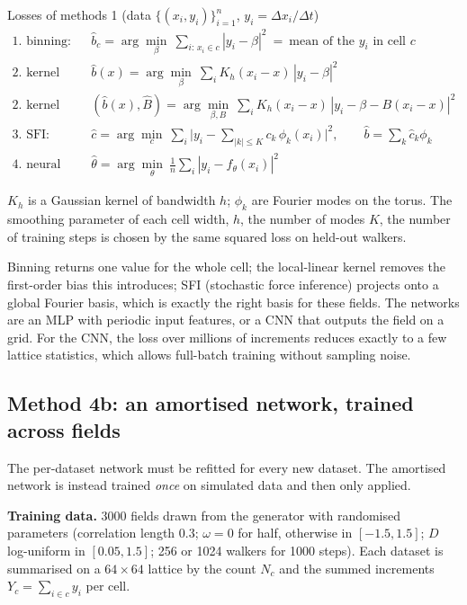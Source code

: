 \documentclass[11pt,a4paper]{article}
\newcommand{\dt}{\Delta t}
\newcommand{\dx}{\Delta x}
\begin{document}
\begin{lossbox}{Losses of methods 1 (data $\{(x_i,y_i)\}_{i=1}^n$, $y_i=\dx_i/\dt$)}
\vspace{-0.6em}
\begin{align*}
\text{1. binning:}\quad
  & \hat b_c = \arg\min_{\beta}\ \sum_{i:\,x_i\in c}|y_i-\beta|^2
    \ =\ \text{mean of the $y_i$ in cell $c$} \\
\text{2. kernel (NW):}\quad
  & \hat b(x) = \arg\min_{\beta}\ \sum_i K_h(x_i-x)\,|y_i-\beta|^2 \\
\text{2. kernel (local-linear):}\quad
  & (\hat b(x),\hat B) = \arg\min_{\beta,B}\ \sum_i K_h(x_i-x)\,|y_i-\beta-B(x_i-x)|^2 \\
\text{3. SFI:}\quad
  & \hat c = \arg\min_{c}\ \sum_i \Big|y_i-\sum_{|k|\le K} c_k\,\phi_k(x_i)\Big|^2,
    \qquad \hat b=\textstyle\sum_k \hat c_k\phi_k \\
\text{4. neural network:}\quad
  & \hat\theta = \arg\min_{\theta}\ \frac1n\sum_i |y_i-f_\theta(x_i)|^2
\end{align*}
\vspace{-1.1em}

$K_h$ is a Gaussian kernel of bandwidth $h$; $\phi_k$ are Fourier modes on the torus. The
smoothing parameter of each \textemdash{} cell width, $h$, the number of modes $K$, the number
of training steps \textemdash{} is chosen by the same squared loss on held-out walkers.
\end{lossbox}

Binning returns one value for the whole cell; the local-linear kernel removes the
first-order bias this introduces; SFI (stochastic force inference) projects onto a global
Fourier basis, which is exactly the right basis for these fields. The networks are an MLP
with periodic input features, or a CNN that outputs the field on a grid. For the CNN, the
loss over millions of increments reduces exactly to a few lattice statistics, which allows
full-batch training without sampling noise.

\subsection{Method 4b: an amortised network, trained across fields}

The per-dataset network must be refitted for every new dataset. The amortised network is
instead trained \emph{once} on simulated data and then only applied.

\textbf{Training data.} 3000 fields drawn from the generator with randomised parameters
(correlation length 0.3; $\omega=0$ for half, otherwise in $[-1.5,1.5]$; $D$
log-uniform in $[0.05,1.5]$; 256 or 1024 walkers for 1000 steps). Each
dataset is summarised on a $64\times64$ lattice by the count $N_c$ and the summed increments
$Y_c=\sum_{i\in c}y_i$ per cell.
\end{document}
